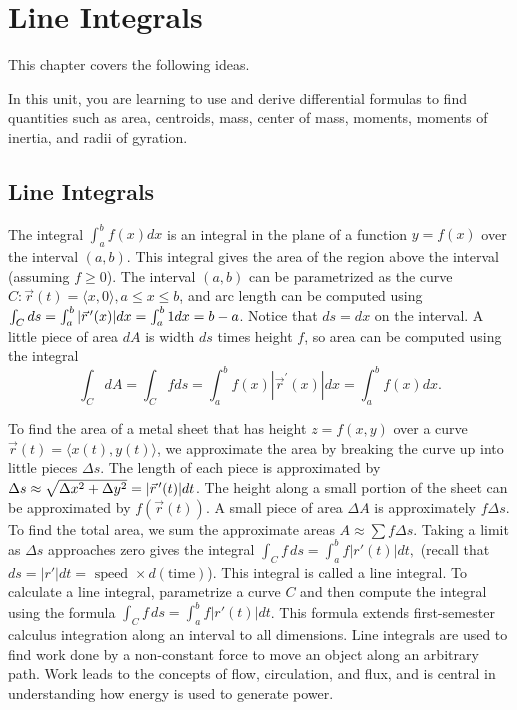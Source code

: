 
\chapter{Line Integrals}

This chapter covers the following ideas. 


In this unit, you are learning to use and derive differential formulas
to find quantities such as area, centroids, mass, center of mass,
moments, moments of inertia, and radii of gyration.

\section{Line Integrals}

%
The integral $\int_a^b f(x)dx$ is an integral in the plane of a function
$y=f(x)$ over the interval $(a,b)$.  This integral gives the area of
the region above the interval (assuming $f\geq 0$).  The interval $(a,b)$
can be parametrized as the curve $C\colon\vec r(t)= \langle x,0\rangle, a\leq x\leq
b$, and arc length can be computed using $\int_C ds = \int_a^b |\vec
r^{\,\prime}(x)|dx = \int_a^b 1 dx = b-a$. Notice that $ds=dx$ on the interval. A
little piece of area $dA$ is width $ds$ times height $f$, so area can
be computed using the integral 
$$\int_C dA = \int_C f ds = \int_a^b f(x)|\vec
r^\prime(x)|dx = \int_a^b f(x) dx.$$

To find the area of a metal sheet that has height $z=f(x,y) $ over a
curve $ \vec r(t)=\langle x(t),y(t)\rangle $, we approximate the area by breaking
the curve up into little pieces $\Delta s$. The length of each piece is
approximated by {$ \Delta s \approx \sqrt{\Delta x^2 +\Delta y^2} =|\vec r^{\,\prime}(t)|dt$}. The
height along a small portion of the sheet can be approximated by
$f(\vec r(t))$. A small piece of area $\Delta A$ is approximately $f\Delta s
$. To find the total area, we sum the approximate areas $A\approx \sum f\Delta s$.
Taking a limit as $\Delta s$ approaches zero gives the integral $ \int_C f \,ds
= \int_a^b f |r'(t)|dt,$ (recall that $ds = |r'| dt = \text{ speed } \times
d(\text{time})$).  This integral is called a line integral.  To
calculate a line integral, parametrize a curve $C$ and then compute
the integral using the formula $ \int_C f\,ds = \int_a^b f |r'(t)|dt $. This
formula extends first-semester calculus integration along an interval
to all dimensions.  Line integrals are used to find work done by a
non-constant force to move an object along an arbitrary path. Work
leads to the concepts of flow, circulation, and flux, and is central
in understanding how energy is used to generate power.

